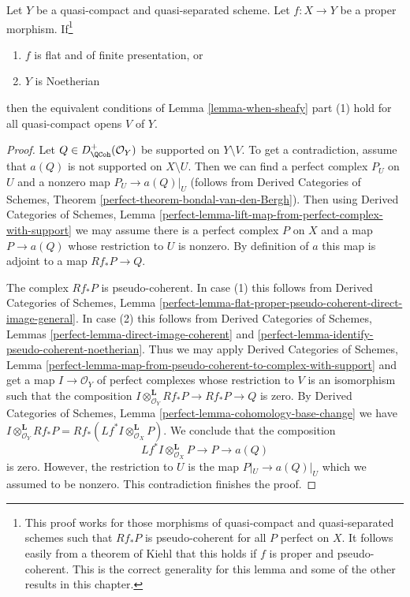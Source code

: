 \begin{lemma}
\label{lemma-proper-noetherian}
Let $Y$ be a quasi-compact and quasi-separated scheme.
Let $f : X \to Y$ be a proper morphism. If\footnote{This proof works for those
morphisms of quasi-compact and quasi-separated schemes such that
$Rf_*P$ is pseudo-coherent for all $P$ perfect on $X$. It follows
easily from a theorem of Kiehl \cite{Kiehl} that this holds if
$f$ is proper and pseudo-coherent. This is the correct generality
for this lemma and some of the other results in this chapter.}
\begin{enumerate}
\item $f$ is flat and of finite presentation, or
\item $Y$ is Noetherian
\end{enumerate}
then the equivalent conditions of Lemma \ref{lemma-when-sheafy} part (1)
hold for all quasi-compact opens $V$ of $Y$.
\end{lemma}

\begin{proof}
Let $Q \in D^+_\QCoh(\mathcal{O}_Y)$ be supported on $Y \setminus V$.
To get a contradiction, assume that $a(Q)$ is not supported on
$X \setminus U$. Then we can find a perfect complex $P_U$ on $U$
and a nonzero map $P_U \to a(Q)|_U$ (follows from
Derived Categories of Schemes, Theorem
\ref{perfect-theorem-bondal-van-den-Bergh}). Then using
Derived Categories of Schemes, Lemma
\ref{perfect-lemma-lift-map-from-perfect-complex-with-support}
we may assume there is a perfect complex $P$ on $X$ and a map
$P \to a(Q)$ whose restriction to $U$ is nonzero.
By definition of $a$ this map
is adjoint to a map $Rf_*P \to Q$.

\medskip\noindent
The complex $Rf_*P$ is pseudo-coherent. In case (1) this follows
from Derived Categories of Schemes, Lemma
\ref{perfect-lemma-flat-proper-pseudo-coherent-direct-image-general}.
In case (2) this follows from
Derived Categories of Schemes, Lemmas
\ref{perfect-lemma-direct-image-coherent} and
\ref{perfect-lemma-identify-pseudo-coherent-noetherian}.
Thus we may apply
Derived Categories of Schemes, Lemma
\ref{perfect-lemma-map-from-pseudo-coherent-to-complex-with-support}
and get a map $I \to \mathcal{O}_Y$ of perfect complexes
whose restriction to $V$ is an isomorphism such that the composition
$I \otimes^\mathbf{L}_{\mathcal{O}_Y} Rf_*P \to Rf_*P \to Q$ is zero.
By Derived Categories of Schemes, Lemma
\ref{perfect-lemma-cohomology-base-change}
we have $I \otimes^\mathbf{L}_{\mathcal{O}_Y} Rf_*P =
Rf_*(Lf^*I \otimes^\mathbf{L}_{\mathcal{O}_X} P)$.
We conclude that the composition
$$
Lf^*I \otimes^\mathbf{L}_{\mathcal{O}_X} P \to P \to a(Q)
$$
is zero. However, the restriction to $U$ is the map
$P|_U \to a(Q)|_U$ which we assumed to be nonzero.
This contradiction finishes the proof.
\end{proof}